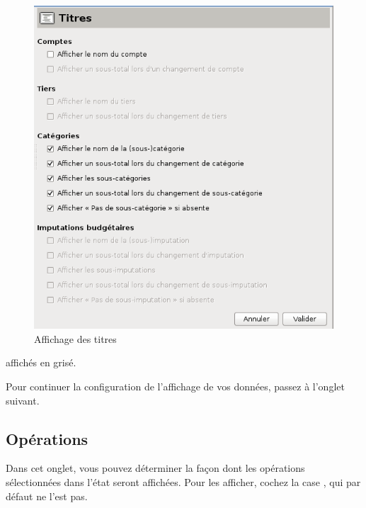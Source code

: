 \begin{figure}[h!]
\begin{center}
\includegraphics[scale=0.5]{image/screenshot/reportcreation_display_titles}
\end{center}
\caption{Affichage des titres}
\label{reportcreation-display-titles-img}
\end{figure}
\else affichés en grisé.
\fi


Pour continuer la configuration de l'affichage de vos données, passez à l'onglet suivant.


\subsection{Opérations\label{reportscreation-display-transactions}}

Dans cet onglet, vous pouvez déterminer la façon dont les opérations sélectionnées dans l'état seront affichées. Pour les afficher, cochez la case , qui \ifIllustration  par défaut ne l'est pas.

